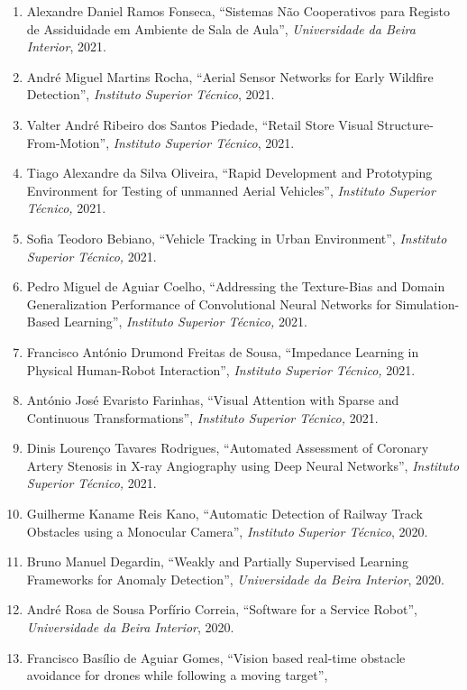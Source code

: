 \begin{enumerate}
  Identification of Human Ankle Dynamics'', \emph{Instituto Superior
  Técnico}, 2021.
\item
  Alexandre Daniel Ramos Fonseca, ``Sistemas Não Cooperativos para
  Registo de Assiduidade em Ambiente de Sala de Aula'',
  \emph{Universidade da Beira Interior}, 2021.
\item
  André Miguel Martins Rocha, ``Aerial Sensor Networks for Early
  Wildfire Detection'', \emph{Instituto Superior Técnico}, 2021.
\item
  Valter André Ribeiro dos Santos Piedade, ``Retail Store Visual
  Structure-From-Motion'', \emph{Instituto Superior Técnico}, 2021.
\item
  Tiago Alexandre da Silva Oliveira, ``Rapid Development and Prototyping
  Environment for Testing of unmanned Aerial Vehicles'', \emph{Instituto
  Superior Técnico,} 2021.
\item
  Sofia Teodoro Bebiano, ``Vehicle Tracking in Urban Environment'',
  \emph{Instituto Superior Técnico,} 2021.
\item
  Pedro Miguel de Aguiar Coelho, ``Addressing the Texture-Bias and
  Domain Generalization Performance of Convolutional Neural Networks for
  Simulation-Based Learning'', \emph{Instituto Superior Técnico,} 2021.
\item
  Francisco António Drumond Freitas de Sousa, ``Impedance Learning in
  Physical Human-Robot Interaction'', \emph{Instituto Superior Técnico,}
  2021.
\item
  António José Evaristo Farinhas, ``Visual Attention with Sparse and
  Continuous Transformations'', \emph{Instituto Superior Técnico,} 2021.
\item
  Dinis Lourenço Tavares Rodrigues, ``Automated Assessment of Coronary
  Artery Stenosis in X-ray Angiography using Deep Neural Networks'',
  \emph{Instituto Superior Técnico,} 2021.
\item
  Guilherme Kaname Reis Kano, ``Automatic Detection of Railway Track
  Obstacles using a Monocular Camera'', \emph{Instituto Superior
  Técnico}, 2020.
\item
  Bruno Manuel Degardin, ``Weakly and Partially Supervised Learning
  Frameworks for Anomaly Detection'', \emph{Universidade da Beira
  Interior}, 2020.
\item
  André Rosa de Sousa Porfírio Correia, ``Software for a Service
  Robot'', \emph{Universidade da Beira Interior}, 2020.
\item
  Francisco Basílio de Aguiar Gomes, ``Vision based real-time obstacle
  avoidance for drones while following a moving target'',

\end{enumerate}
